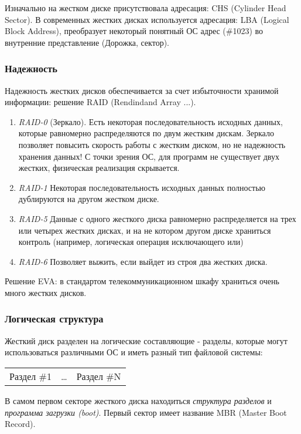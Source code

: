 \documentclass[]{article}
\begin{document}
			 Изначально на жестком диске присутствовала адресация: CHS (Cylinder Head Sector).
			 В современных жестких дисках используется адресация: LBA (Logical Block Address), преобразует некоторый понятный ОС адрес (\#1023) во внутренние представление (Дорожка, сектор).
			 
			 \subsubsection{Надежность}
			 Надежность жестких дисков обеспечивается за счет избыточности хранимой информации: решение RAID (Rendindand Array ...).
			 
			 \begin{enumerate}
			 	\item \textit{RAID-0} (Зеркало). Есть некоторая последовательность исходных данных, которые равномерно распределяются по двум жестким дискам. Зеркало позволяет повысить скорость работы с жестким диском, но не надежность хранения данных! С точки зрения ОС, для программ не существует двух жестких, физическая реализация скрывается.
			 	
			 	\item \textit{RAID-1} Некоторая последовательность исходных данных полностью дублируются на другом жестком диске.
			 	
			 	\item \textit{RAID-5}  Данные с одного жесткого диска равномерно распределяется на трех или четырех жестких дисках, и на не котором другом диске храниться контроль (например, логическая операция исключающего или)
			 	
			 	\item \textit{RAID-6} Позволяет выжить, если выйдет из строя два жестких диска.
			 \end{enumerate}
			 
			 Решение EVA: в стандартом телекоммуникационном шкафу храниться очень много жестких дисков.
			 
			 \subsubsection{Логическая структура}
			 Жесткий диск разделен на логические составляющие - разделы, которые могут использоваться различными ОС и иметь разный тип файловой системы:
			 \begin{tabular}{|c|c|c|}
				Раздел \#1 & \dots & Раздел \#N
			 \end{tabular}
			
			В самом первом секторе жесткого диска находиться \textit{структура разделов} и \textit{программа загрузки (boot)}. Первый сектор имеет название MBR (Master Boot Record).
			
\end{document}
